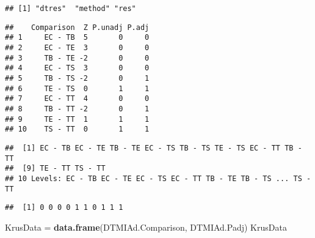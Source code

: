 \documentclass[]{article}
\newenvironment{Shaded}{\begin{snugshade}}{\end{snugshade}}
\newcommand{\DataTypeTok}[1]{\textcolor[rgb]{0.13,0.29,0.53}{#1}}
\newcommand{\DecValTok}[1]{\textcolor[rgb]{0.00,0.00,0.81}{#1}}
\newcommand{\KeywordTok}[1]{\textcolor[rgb]{0.13,0.29,0.53}{\textbf{#1}}}
\newcommand{\NormalTok}[1]{#1}
\newcommand{\OperatorTok}[1]{\textcolor[rgb]{0.81,0.36,0.00}{\textbf{#1}}}
\newcommand{\StringTok}[1]{\textcolor[rgb]{0.31,0.60,0.02}{#1}}
\begin{document}
\begin{verbatim}
## [1] "dtres"  "method" "res"
\end{verbatim}

\begin{Shaded}
\end{Shaded}

\begin{verbatim}
##    Comparison  Z P.unadj P.adj
## 1     EC - TB  5       0     0
## 2     EC - TE  3       0     0
## 3     TB - TE -2       0     0
## 4     EC - TS  3       0     0
## 5     TB - TS -2       0     1
## 6     TE - TS  0       1     1
## 7     EC - TT  4       0     0
## 8     TB - TT -2       0     1
## 9     TE - TT  1       1     1
## 10    TS - TT  0       1     1
\end{verbatim}

\begin{Shaded}
\end{Shaded}

\begin{verbatim}
##  [1] EC - TB EC - TE TB - TE EC - TS TB - TS TE - TS EC - TT TB - TT
##  [9] TE - TT TS - TT
## 10 Levels: EC - TB EC - TE EC - TS EC - TT TB - TE TB - TS ... TS - TT
\end{verbatim}

\begin{Shaded}
\end{Shaded}

\begin{verbatim}
##  [1] 0 0 0 0 1 1 0 1 1 1
\end{verbatim}

\begin{Shaded}
\begin{Highlighting}[]
\NormalTok{KrusData =}\StringTok{ }\KeywordTok{data.frame}\NormalTok{(DTMIAd.Comparison, DTMIAd.Padj)}
\NormalTok{KrusData}
\end{Highlighting}
\end{Shaded}
\end{document}
